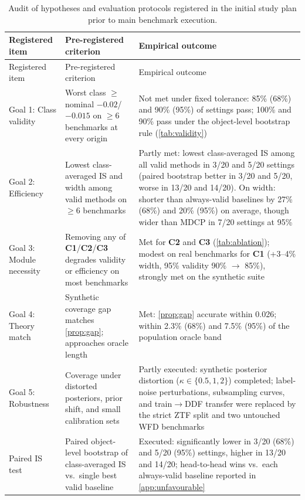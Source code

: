\begingroup
\scriptsize
\begin{longtable}{p{2.5cm}p{4.2cm}p{8.3cm}}
\caption{Audit of hypotheses and evaluation protocols registered in the initial study plan prior to main benchmark execution.}
\label{tab:plan}\\
\toprule
Registered item & Pre-registered criterion & Empirical outcome \\
\midrule
\endfirsthead
\toprule
Registered item & Pre-registered criterion & Empirical outcome \\
\midrule
\endhead
Goal 1: Class validity & Worst class $\ge$ nominal $-0.02$/$-0.015$ on $\ge$6 benchmarks at every origin & Not met under fixed tolerance: 85\% (68\%) and 90\% (95\%) of settings pass; 100\% and 90\% pass under the object-level bootstrap rule (\cref{tab:validity}) \\
Goal 2: Efficiency & Lowest class-averaged IS and width among valid methods on $\ge$6 benchmarks & Partly met: lowest class-averaged IS among all valid methods in 3/20 and 5/20 settings (paired bootstrap better in 3/20 and 5/20, worse in 13/20 and 14/20). On width: shorter than always-valid baselines by 27\% (68\%) and 20\% (95\%) on average, though wider than MDCP in 7/20 settings at 95\% \\
Goal 3: Module necessity & Removing any of \textbf{C1}/\textbf{C2}/\textbf{C3} degrades validity or efficiency on most benchmarks & Met for \textbf{C2} and \textbf{C3} (\cref{tab:ablation}); modest on real benchmarks for \textbf{C1} (+3--4\% width, 95\% validity 90\% $\to$ 85\%), strongly met on the synthetic suite \\
Goal 4: Theory match & Synthetic coverage gap matches \cref{prop:gap}; \gamut{} approaches oracle length & Met: \cref{prop:gap} accurate within 0.026; \gamut{} within 2.3\% (68\%) and 7.5\% (95\%) of the population oracle band \\
Goal 5: Robustness & Coverage under distorted posteriors, prior shift, and small calibration sets & Partly executed: synthetic posterior distortion ($\kappa\in\{0.5,1,2\}$) completed; label-noise perturbations, subsampling curves, and train$\to$DDF transfer were replaced by the strict ZTF split and two untouched WFD benchmarks \\
Paired IS test & Paired object-level bootstrap of class-averaged IS vs.\ single best valid baseline & Executed: significantly lower in 3/20 (68\%) and 5/20 (95\%) settings, higher in 13/20 and 14/20; head-to-head wins vs.\ each always-valid baseline reported in \cref{app:unfavourable} \\

\end{longtable}
